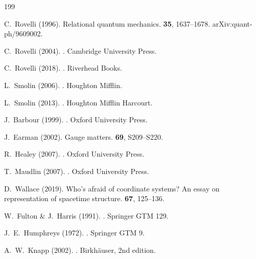 \documentclass[11pt,a4paper,openright]{book}
\theoremstyle{plain}
\theoremstyle{definition}
\begin{document}
\begin{thebibliography}{199}


C.~Rovelli (1996).
\newblock Relational quantum mechanics.
 {\bf 35}, 1637--1678.
\newblock arXiv:quant-ph/9609002.

C.~Rovelli (2004).
.
\newblock Cambridge University Press.

C.~Rovelli (2018).
.
\newblock Riverhead Books.

L.~Smolin (2006).
.
\newblock Houghton Mifflin.

L.~Smolin (2013).
.
\newblock Houghton Mifflin Harcourt.

J.~Barbour (1999).
.
\newblock Oxford University Press.

J.~Earman (2002).
\newblock Gauge matters.
 {\bf 69}, S209--S220.

R.~Healey (2007).
.
\newblock Oxford University Press.

T.~Maudlin (2007).
.
\newblock Oxford University Press.

D.~Wallace (2019).
\newblock Who's afraid of coordinate systems? An essay on representation of spacetime structure.
 {\bf 67}, 125--136.


W.~Fulton \& J.~Harris (1991).
.
\newblock Springer GTM 129.

J.~E.~Humphreys (1972).
.
\newblock Springer GTM 9.

A.~W.~Knapp (2002).
.
\newblock Birkhäuser, 2nd edition.


\end{thebibliography}
\end{document}
